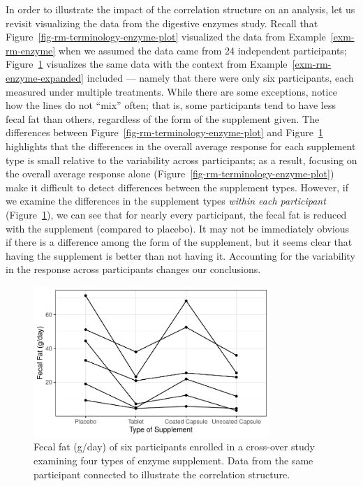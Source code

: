 \documentclass[
  letterpaper,
  DIV=11,
  numbers=noendperiod]{scrreprt}
\theoremstyle{definition}
\theoremstyle{definition}
\theoremstyle{remark}
\begin{document}
In order to illustrate the impact of the correlation structure on an
analysis, let us revisit visualizing the data from the digestive enzymes
study. Recall that Figure~\ref{fig-rm-terminology-enzyme-plot}
visualized the data from Example~\ref{exm-rm-enzyme} when we assumed the
data came from 24 independent participants;
Figure~\ref{fig-rm-terminology-enzyme-plot-expanded} visualizes the same
data with the context from Example~\ref{exm-rm-enzyme-expanded} included
--- namely that there were only six participants, each measured under
multiple treatments. While there are some exceptions, notice how the
lines do not ``mix'' often; that is, some participants tend to have less
fecal fat than others, regardless of the form of the supplement given.
The differences between Figure~\ref{fig-rm-terminology-enzyme-plot} and
Figure~\ref{fig-rm-terminology-enzyme-plot-expanded} highlights that the
differences in the overall average response for each supplement type is
small relative to the variability across participants; as a result,
focusing on the overall average response alone
(Figure~\ref{fig-rm-terminology-enzyme-plot}) make it difficult to
detect differences between the supplement types. However, if we examine
the differences in the supplement types \emph{within each participant}
(Figure~\ref{fig-rm-terminology-enzyme-plot-expanded}), we can see that
for nearly every participant, the fecal fat is reduced with the
supplement (compared to placebo). It may not be immediately obvious if
there is a difference among the form of the supplement, but it seems
clear that having the supplement is better than not having it.
Accounting for the variability in the response across participants
changes our conclusions.

\begin{figure}

{\centering \includegraphics[width=0.8\textwidth,height=\textheight]{./images/fig-rm-terminology-enzyme-plot-expanded-1.pdf}

}

\caption{\label{fig-rm-terminology-enzyme-plot-expanded}Fecal fat
(g/day) of six participants enrolled in a cross-over study examining
four types of enzyme supplement. Data from the same participant
connected to illustrate the correlation structure.}

\end{figure}
\end{document}

